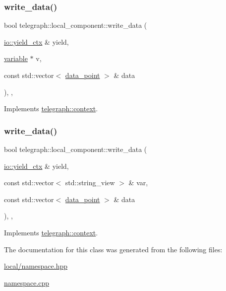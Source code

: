\subsubsection{\texorpdfstring{write\+\_\+data()}{write\_data()}\hspace{0.1cm}{\footnotesize\ttfamily [1/2]}}
{\footnotesize\ttfamily bool telegraph\+::local\+\_\+component\+::write\+\_\+data (\begin{DoxyParamCaption}\item[{\hyperlink{structboost_1_1asio_1_1yield__ctx}{io\+::yield\+\_\+ctx} \&}]{yield,  }\item[{\hyperlink{classtelegraph_1_1variable}{variable} $\ast$}]{v,  }\item[{const std\+::vector$<$ \hyperlink{classtelegraph_1_1data__point}{data\+\_\+point} $>$ \&}]{data }\end{DoxyParamCaption})\hspace{0.3cm}{\ttfamily [inline]}, {\ttfamily [override]}, {\ttfamily [virtual]}}



Implements \hyperlink{classtelegraph_1_1context_a6067b9a6f2590733c81f6a3b2ed9cba7}{telegraph\+::context}.

\mbox{\label{classtelegraph_1_1local__component_a572a4116130a4b7ad270701eba2af0e7}} 
\subsubsection{\texorpdfstring{write\+\_\+data()}{write\_data()}\hspace{0.1cm}{\footnotesize\ttfamily [2/2]}}
{\footnotesize\ttfamily bool telegraph\+::local\+\_\+component\+::write\+\_\+data (\begin{DoxyParamCaption}\item[{\hyperlink{structboost_1_1asio_1_1yield__ctx}{io\+::yield\+\_\+ctx} \&}]{yield,  }\item[{const std\+::vector$<$ std\+::string\+\_\+view $>$ \&}]{var,  }\item[{const std\+::vector$<$ \hyperlink{classtelegraph_1_1data__point}{data\+\_\+point} $>$ \&}]{data }\end{DoxyParamCaption})\hspace{0.3cm}{\ttfamily [inline]}, {\ttfamily [override]}, {\ttfamily [virtual]}}



Implements \hyperlink{classtelegraph_1_1context_a1f600d6159df21dd2750b1c706ca3412}{telegraph\+::context}.



The documentation for this class was generated from the following files\+:\begin{DoxyCompactItemize}
\item 
\hyperlink{local_2namespace_8hpp}{local/namespace.\+hpp}\item 
\hyperlink{namespace_8cpp}{namespace.\+cpp}\end{DoxyCompactItemize}
